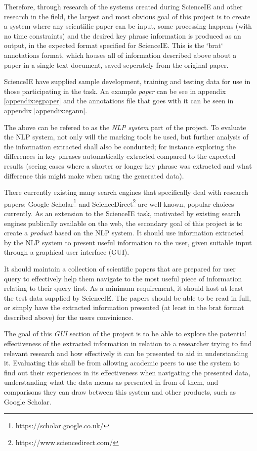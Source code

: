 Therefore, through research of the systems created during ScienceIE and other research in the field, the largest and most obvious goal of this project is to create a system where any scientiific paper can be input, some processing happens (with no time constraints) and the desired key phrase information is produced as an output, in the expected format specified for ScienceIE. This is the `brat` annotations format, which houses all of information described above about a paper in a single text document, saved seperately from the original paper. 

ScienceIE have supplied sample development, training and testing data for use in those participating in the task. An example \textit{paper} can be see in appendix \ref{appendix:egpaper} and the annotations file that goes with it can be seen in appendix \ref{appendix:egann}.

The above can be refered to as the \textit{NLP system} part of the project. To evaluate the NLP system, not only will the marking tools be used, but further analysis of the information extracted shall also be conducted; for instance exploring the differences in key phrases automatically extracted compared to the expected results (seeing cases where a shorter or longer key phrase was extracted and what difference this might make when using the generated data).

There currently existing many search engines that specifically deal with research papers; Google Scholar\footnote{https://scholar.google.co.uk/} and ScienceDirect\footnote{https://www.sciencedirect.com/} are well known, popular choices currently. As an extension to the ScienceIE task, motivated by existing search engines publically available on the web, the secondary goal of this project is to create a \textit{product} based on the NLP system. It should use information extracted by the NLP system to present useful information to the user, given suitable input through a graphical user interface (GUI).

It should maintain a collection of scientific papers that are prepared for user query to effectively help them navigate to the most useful piece of information relating to their query first. As a minimum requirement, it should host at least the test data supplied by ScienceIE. The papers should be able to be read in full, or simply have the extracted information presented (at least in the brat format described above) for the users convinience.

The goal of this \textit{GUI} section of the project is to be able to explore the potential effectiveness of the extracted information in relation to a researcher trying to find relevant research and how effectively it can be presented to aid in understanding it. Evaluating this shall be from allowing academic peers to use the system to find out their experiences in its effectiveness when navigating the presented data, understanding what the data means as presented in from of them, and comparisons they can draw between this system and other products, such as Google Scholar.

